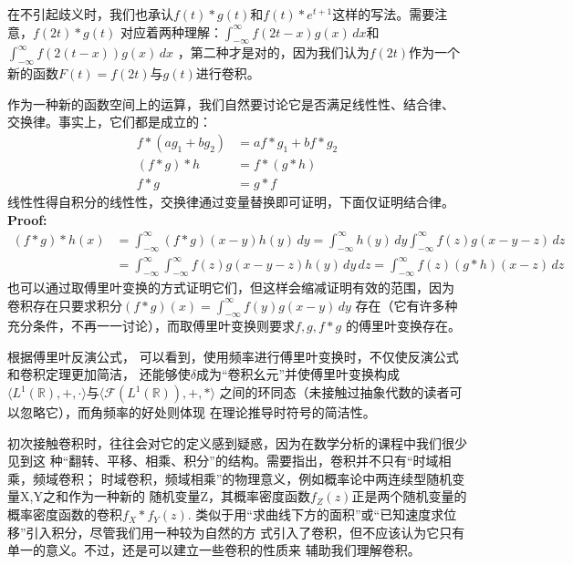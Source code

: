 \documentclass{ctexbook}
\begin{document}
在不引起歧义时，我们也承认$f(t)*g(t)$和$f(t)*e^{t+1}$这样的写法。需要注意，$f(2t)*g(t)$
对应着两种理解：$\int_{-\infty}^{\infty}f(2t-x)g(x)\,dx$和$\int_{-\infty}^{\infty}f(2(t-x))g(x)\,dx$
，第二种才是对的，因为我们认为$f(2t)$作为一个新的函数$F(t)=f(2t)$与$g(t)$进行卷积。

作为一种新的函数空间上的运算，我们自然要讨论它是否满足线性性、结合律、
交换律。事实上，它们都是成立的：
\begin{align}
    f*(ag_1+bg_2) & =af*g_1+bf*g_2 \\
    (f*g)*h       & =f*(g*h)       \\
    f*g           & =g*f
\end{align}
线性性得自积分的线性性，交换律通过变量替换即可证明，下面仅证明结合律。\\
\textbf{Proof:}
\begin{align*}
    (f*g)*h(x) & =\int_{-\infty}^{\infty}(f*g)(x-y)h(y)\,dy=\int_{-\infty}^{\infty}h(y)\,dy\int_{-\infty}^{\infty}f(z)g(x-y-z)\,dz \\
               & =\int_{-\infty}^{\infty}\int_{-\infty}^{\infty}f(z)g(x-y-z)h(y)\,dy\,dz=\int_{-\infty}^{\infty}f(z)(g*h)(x-z)\,dz
\end{align*}
也可以通过取傅里叶变换的方式证明它们，但这样会缩减证明有效的范围，因为
卷积存在只要求积分$(f*g)(x)=\int_{-\infty}^{\infty}f(y)g(x-y)\,dy$
存在（它有许多种充分条件，不再一一讨论），而取傅里叶变换则要求$f,g,f*g$
的傅里叶变换存在。

根据傅里叶反演公式，
可以看到，使用频率进行傅里叶变换时，不仅使反演公式和卷积定理更加简洁，
还能够使$\delta$成为“卷积幺元”并使傅里叶变换构成
$\langle L^1(\mathbb{R}),+,\cdot\rangle$与$\langle \mathcal{F} (L^1(\mathbb{R})),+,*\rangle$
之间的环同态（未接触过抽象代数的读者可以忽略它），而角频率的好处则体现
在理论推导时符号的简洁性。

初次接触卷积时，往往会对它的定义感到疑惑，因为在数学分析的课程中我们很少见到这
种“翻转、平移、相乘、积分”的结构。需要指出，卷积并不只有“时域相乘，频域卷积；
时域卷积，频域相乘”的物理意义，例如概率论中两连续型随机变量X,Y之和作为一种新的
随机变量Z，其概率密度函数$f_Z(z)$正是两个随机变量的概率密度函数的卷积$f_X*f_Y(z)$.
类似于用“求曲线下方的面积”或“已知速度求位移”引入积分，尽管我们用一种较为自然的方
式引入了卷积，但不应该认为它只有单一的意义。不过，还是可以建立一些卷积的性质来
辅助我们理解卷积。
\end{document}
